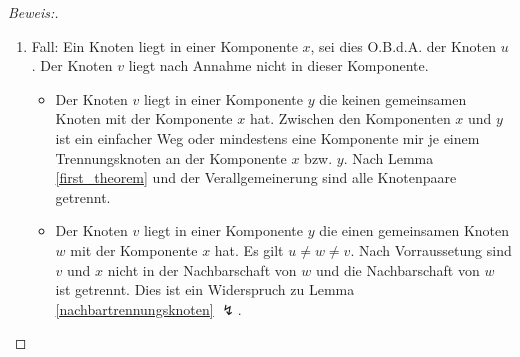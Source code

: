 \begin{proof}[Beweis:]
\begin{enumerate}
\begin{itemize}
\end{itemize}  
\item Fall: Ein Knoten liegt in einer Komponente $x$, sei dies O.B.d.A. der Knoten $u$. Der Knoten $v$ liegt nach Annahme nicht in dieser Komponente. 
\begin{itemize}
\item Der Knoten $v$ liegt in einer Komponente $y$ die keinen gemeinsamen Knoten mit der Komponente $x$ hat. Zwischen den Komponenten $x$ und $y$ ist ein einfacher Weg oder mindestens eine Komponente mir je einem Trennungsknoten an der Komponente $x$ bzw. $y$. Nach Lemma \ref{first_theorem} und der Verallgemeinerung sind alle Knotenpaare getrennt.
\item Der Knoten $v$ liegt in einer Komponente $y$ die einen gemeinsamen Knoten $w$ mit der Komponente $x$ hat. Es gilt $u \neq w \neq v$. Nach Vorraussetung sind $v$ und $x$ nicht in der Nachbarschaft von $w$ und die Nachbarschaft von $w$ ist getrennt. Dies ist ein Widerspruch zu Lemma \ref{nachbartrennungsknoten} $\lightning$.
\end{itemize}  
\end{enumerate}
\end{proof}

